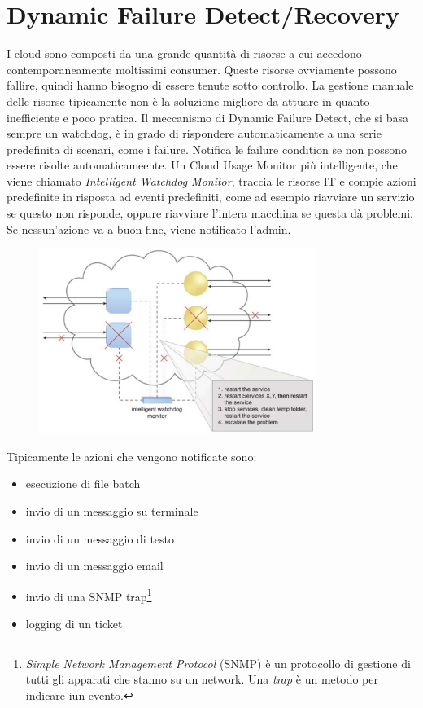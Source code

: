 \section{Dynamic Failure Detect/Recovery}
I cloud sono composti da una grande quantità di risorse a cui accedono contemporaneamente moltissimi consumer. Queste risorse ovviamente possono fallire, quindi hanno bisogno di essere tenute sotto controllo. La gestione manuale delle risorse tipicamente non è la soluzione migliore da attuare in quanto inefficiente e poco pratica. Il meccanismo di Dynamic Failure Detect, che si basa sempre un watchdog, è in grado di rispondere automaticamente a una serie predefinita di scenari, come i failure. Notifica le failure condition se non possono essere risolte automaticameente. 
Un Cloud Usage Monitor più intelligente, che viene chiamato \textit{Intelligent Watchdog Monitor}, traccia le risorse IT e compie azioni predefinite in risposta ad eventi predefiniti, come ad esempio riavviare un servizio se questo non risponde, oppure riavviare l'intera macchina se questa dà problemi. Se nessun'azione va a buon fine, viene notificato l'admin.

\begin{figure}[htb!]
    \centering
    \includegraphics[width=9cm]{./Images/cap12/12.10.png}
\end{figure}

Tipicamente le azioni che vengono notificate sono:
\begin{itemize}
    \item esecuzione di file batch
    \item invio di un messaggio su terminale
    \item invio di un messaggio di testo
    \item invio di un messaggio email
    \item invio di una SNMP trap\footnote{\textit{Simple Network Management Protocol} (SNMP) è un protocollo di gestione di tutti gli apparati che stanno su un network. Una \textit{trap} è un metodo per indicare iun evento.}
    \item logging di un ticket
\end{itemize}

